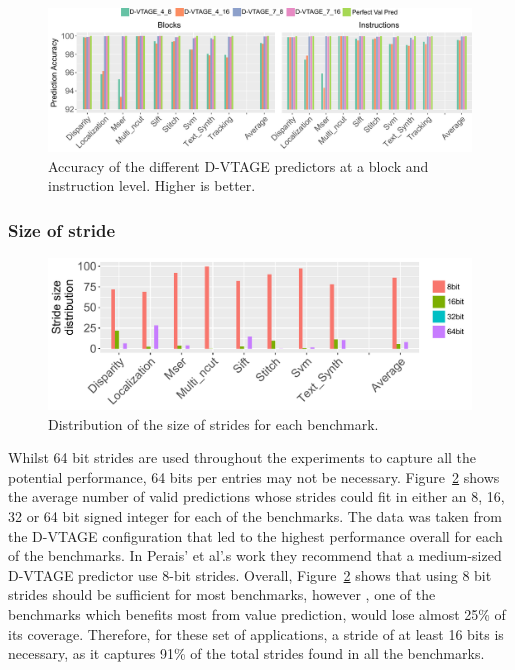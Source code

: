 \begin{figure}[t]
    \centering
    \includegraphics[width=1\textwidth]{chapter3/graphics/predAcc.pdf}
    \caption{Accuracy of the different D-VTAGE predictors at a block and instruction level. Higher is better.}
    \label{fig:vtag_accuracy_block}
	\vspace{1em}
\end{figure}
\subsubsection{Size of stride}

\begin{figure}[t]
    \centering
    \includegraphics[width=1\textwidth]{chapter3/graphics/strides.pdf}
    \caption{Distribution of the size of strides for each benchmark.}
    \label{fig:strides}
	\vspace{1em}
\end{figure}

Whilst 64 bit strides are used throughout the experiments to capture all the potential performance, 64 bits per entries may not be necessary.
Figure~\ref{fig:strides} shows the average number of valid predictions whose strides could fit in either an 8, 16, 32 or 64 bit signed integer for each of the benchmarks.
The data was taken from the D-VTAGE configuration that led to the highest performance overall for each of the benchmarks.
In Perais' et al'.s work they recommend that a medium-sized D-VTAGE predictor use 8-bit strides.
Overall, Figure~\ref{fig:strides} shows that using 8 bit strides should be sufficient for most benchmarks, however , one of the benchmarks which benefits most from value prediction, would lose almost 25\% of its coverage.
Therefore, for these set of applications, a stride of at least 16 bits is necessary, as it captures 91\% of the total strides found in all the benchmarks.

